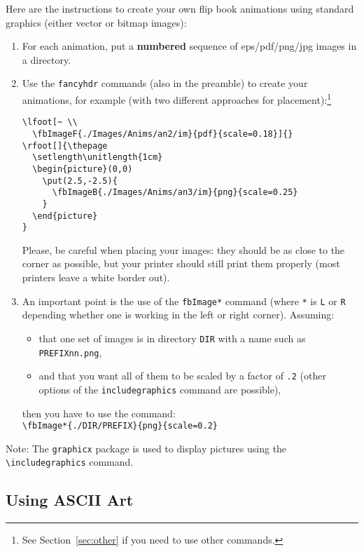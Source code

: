 \documentclass[a4paper,twoside]{article}
\begin{document}
Here are the instructions to create your own flip book animations
using standard graphics (either vector or bitmap images):
\begin{enumerate}
\item For each animation, put a {\bf numbered} sequence of
  eps/pdf/png/jpg images in a directory.
\item Use the {\tt fancyhdr} commands (also in the preamble) to create
  your animations, for example (with two different approaches for
  placement):\footnote{See Section~\ref{sec:other} if you need to use
    other commands.}
\begin{verbatim}
\lfoot[~ \\
  \fbImageF{./Images/Anims/an2/im}{pdf}{scale=0.18}]{}
\rfoot[]{\thepage
  \setlength\unitlength{1cm}
  \begin{picture}(0,0)
    \put(2.5,-2.5){
      \fbImageB{./Images/Anims/an3/im}{png}{scale=0.25}
    }
  \end{picture}
}
\end{verbatim}
  Please, be careful when placing your images: they should be as close
  to the corner as possible, but your printer should still print them
  properly (most printers leave a white border out).
\item An important point is the use of the \verb+fbImage*+ command
  (where \verb+*+ is \verb+L+ or \verb+R+ depending whether one is
  working in the left or right corner). Assuming:
  \begin{itemize}
    \item that one set of images is in directory \verb+DIR+ with a name such as
      \verb+PREFIXnn.png+,
    \item and that you want all of them to be scaled by a factor of
      \verb+.2+ (other options of the \verb+includegraphics+ command
      are possible),
    \end{itemize}
    then you have to use the command:
    \\
    \verb+\fbImage*{./DIR/PREFIX}{png}{scale=0.2}+
\end{enumerate}

Note: The \verb+graphicx+ package is used to display pictures using
the \verb+\includegraphics+ command.

\subsection{Using ASCII Art}
\end{document}
